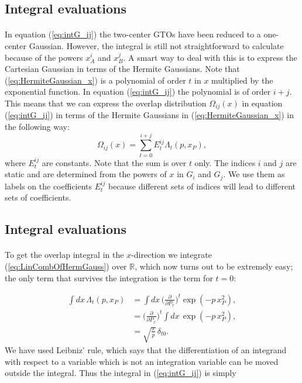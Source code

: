 \documentclass[%
twoside,                 %
final,                   %
10pt]{article}
\begin{document}
\subsection*{Integral evaluations}

\paragraph{}

In equation (\ref{eq:intG_ij}) the two-center GTOs have been reduced to a one-center Gaussian.
However, the integral is still not straightforward to calculate because of the powers $x_A^i$ and $x_B^j$. A smart way to deal with this is to express the Cartesian Gaussian
in terms of the Hermite Gaussians. Note that (\ref{eq:HermiteGaussian_x}) is a polynomial of order $t$ in $x$ multiplied by the exponential function. In equation (\ref{eq:intG_ij}) the polynomial
is of order $i+j$. This means that we can express the overlap distribution $\Omega_{ij}(x)$ in equation (\ref{eq:intG_ij}) in terms of the Hermite Gaussians in (\ref{eq:HermiteGaussian_x}) in the following way:
\begin{equation}
\label{eq:LinCombOfHermGauss}
 \Omega_{ij}(x) = \sum_{t=0}^{i+j} E^{ij}_t \Lambda_t(p, x_P),
\end{equation}
where $E^{ij}_t$ are constants.
Note that the sum is over $t$ only. The indices $i$ and $j$ are static and are determined from the powers of $x$ in $G_i$ and $G_j$.
We use them as labels on the coefficients $E^{ij}_t$ because different sets of indices will lead to different sets of coefficients.



\subsection*{Integral evaluations}

\paragraph{}

To get the overlap integral in the $x$-direction we integrate (\ref{eq:LinCombOfHermGauss}) over $\mathbb{R}$, which now turns out to be extremely easy;
the only term that survives the integration is the term for $t=0$:

\begin{align}
 \int dx\,\Lambda_t(p,x_P) & =  \int dx\,\Big(\frac{\partial}{\partial P_x}\Big)^t\exp(-p\,x^2_P), \\
                           & =  \Big(\frac{\partial}{\partial P_x}\Big)^t \int dx\,\exp(-p\,x^2_P), \\
                           & =  \sqrt{\frac{\pi}{p}}\,\delta_{t0}.
\end{align}
We have used Leibniz' rule, which says that the differentiation of an integrand with respect to a variable which is not an integration variable can
be moved outside the integral. Thus the integral in (\ref{eq:intG_ij}) is simply
\end{document}
